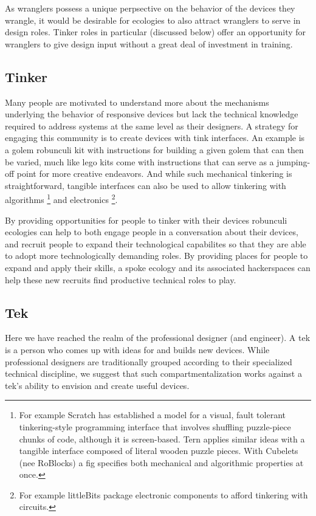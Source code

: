 As wranglers possess a unique perpsective on the behavior of the devices they wrangle, it would be desirable for ecologies to also attract wranglers to serve in design roles. Tinker roles in particular (discussed below) offer an opportunity for wranglers to give design input without a great deal of investment in training.

\subsection{Tinker}
Many people are motivated to understand more about the mechanisms underlying the behavior of responsive devices but lack the technical knowledge required to address systems at the same level as their designers. 
A strategy for engaging this community is to create devices with tink interfaces. 
An example is a golem robunculi kit with instructions for building a given golem that can then be varied, much like lego kits come with instructions that can serve as a jumping-off point for more creative endeavors. 
And while such mechanical tinkering is straightforward, tangible interfaces can also be used to allow tinkering with algorithms%
\footnote{For example Scratch \citep{scratch} has established a model for a visual, fault tolerant tinkering-style programming interface that involves shuffling puzzle-piece chunks of code, although it is screen-based. 
Tern \citep{tern_classroom} applies similar ideas with a tangible interface composed of literal wooden puzzle pieces. 
With Cubelets (nee RoBlocks) \citep{roblocks} a fig specifies both mechanical and algorithmic properties at once.} 
and electronics%
\footnote{For example littleBits \citep{littlebits} package electronic components to afford tinkering with circuits.}.

By providing opportunities for people to tinker with their devices robunculi ecologies can help to both engage people in a conversation about their devices, and recruit people to expand their technological capabilites so that they are able to adopt more technologically demanding roles. By providing places for people to expand and apply their skills, a spoke ecology and its associated hackerspaces can help these new recruits find productive technical roles to play.

\subsection{Tek}
Here we have reached the realm of the professional designer (and engineer). A tek is a person who comes up with ideas for and builds new devices. 
While professional designers are traditionally grouped according to their specialized technical discipline, we suggest that such compartmentalization works against a tek's ability to envision and create useful devices. 


